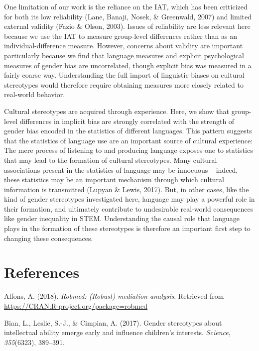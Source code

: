 \documentclass[man,floatsintext]{apa6}
\begin{document}
One limitation of our work is the reliance on the IAT, which has been criticized for both its low reliability (Lane, Banaji, Nosek, \& Greenwald, 2007) and limited external validity (Fazio \& Olson, 2003). Issues of reliability are less relevant here because we use the IAT to measure group-level differences rather than as an individual-difference measure. However, concerns about validity are important particularly because we find that language measures and explicit psychological measures of gender bias are uncorrelated, though explicit bias was measured in a fairly coarse way. Understanding the full import of linguistic biases on cultural stereotypes would therefore require obtaining measures more closely related to real-world behavior.

Cultural stereotypes are acquired through experience. Here, we show that group-level differences in implicit bias are strongly correlated with the strength of gender bias encoded in the statistics of different languages. This pattern suggests that the statistics of language use are an important source of cultural experience: The mere process of listening to and producing language exposes one to statistics that may lead to the formation of cultural stereotypes. Many cultural associations present in the statistics of language may be innocuous -- indeed, these statistics may be an important mechanism through which cultural information is transmitted (Lupyan \& Lewis, 2017). But, in other cases, like the kind of gender stereotypes investigated here, language may play a powerful role in their formation, and ultimately contribute to undesirable real-world consequences like gender inequality in STEM. Understanding the causal role that language plays in the formation of these stereotypes is therefore an important first step to changing these consequences.

\newpage

\hypertarget{references}{%
\section{References}\label{references}}

\begingroup
\setlength{\parindent}{-0.5in}
\setlength{\leftskip}{0.5in}

\hypertarget{refs}{}
\leavevmode\hypertarget{ref-robmed}{}%
Alfons, A. (2018). \emph{Robmed: (Robust) mediation analysis}. Retrieved from \url{https://CRAN.R-project.org/package=robmed}

\leavevmode\hypertarget{ref-bian2017gender}{}%
Bian, L., Leslie, S.-J., \& Cimpian, A. (2017). Gender stereotypes about intellectual ability emerge early and influence children's interests. \emph{Science}, \emph{355}(6323), 389--391.
\end{document}

